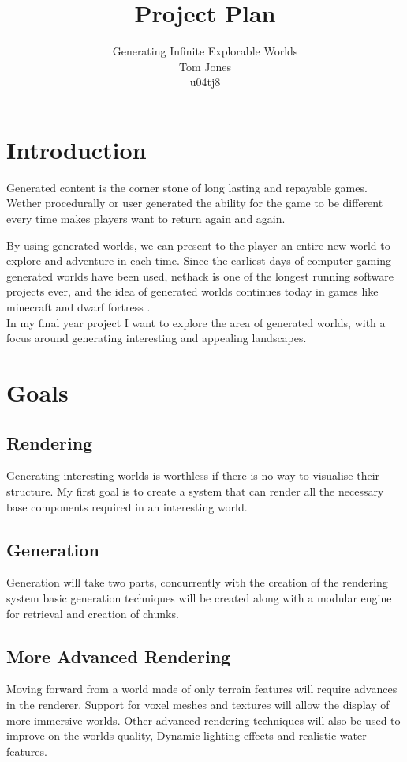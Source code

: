 \documentclass[a4paper,12pt,notitlepage]{article}
\begin{document}
\title{Project Plan}
\author{Generating Infinite Explorable Worlds\\Tom Jones\\u04tj8}
\maketitle

\section{Introduction}
Generated content is the corner stone of long lasting and repayable games. Wether procedurally or
user generated the ability for the game to be different every time makes players 
want to return again and again.

By using generated worlds, we can present to the player an entire new world to 
explore and adventure in each time. Since the earliest days of computer gaming
generated worlds have been used, nethack \cite{nethack}
is one of the longest running software
projects ever, and the idea of generated worlds continues today in games like 
minecraft \cite{minecraft} and dwarf fortress \cite{dwarffortress}.\\

\noindent
In my final year project I want to explore the area of generated worlds, with a 
focus around generating interesting and appealing landscapes.

\section{Goals}
\subsection*{Rendering}
Generating interesting worlds is worthless if there is no way to visualise their
structure. My first goal is to create a system that can render all the necessary
base components required in an interesting world.

\subsection*{Generation}
Generation will take two parts, concurrently with the creation of the rendering 
system basic generation techniques will be created along with a modular engine
for retrieval and creation of chunks.

\subsection*{More Advanced Rendering}
Moving forward from a world made of only terrain features will require advances
in the renderer. Support for voxel meshes and textures will allow the display of 
more immersive worlds. Other advanced rendering techniques will also be used to
improve on the worlds quality, Dynamic lighting effects and realistic water 
features.
\end{document}

